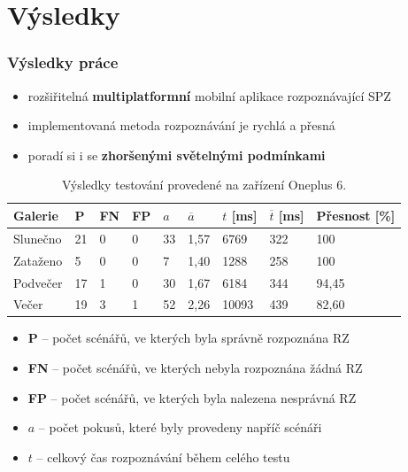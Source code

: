 \documentclass{beamer}
\begin{document}
\section{Výsledky}
\begin{frame}
\frametitle{Výsledky práce}
\begin{itemize}
    \item rozšiřitelná \textbf{multiplatformní} mobilní aplikace rozpoznávající SPZ
    \item implementovaná metoda rozpoznávání je rychlá a přesná
    \item poradí si i se \textbf{zhoršenými světelnými podmínkami}
\end{itemize}

\pause

\begin{table}[!ht]
    \centering
        \begin{tabular}{| l | l | l | l | l | l | l | l | l |}
            \hline
            Galerie & P & FN & FP & $a$ & $\overline{a}$ & $t$ [ms] & $\overline{t}$ [ms] & Přesnost [\%]  \\ \hline \hline
            Slunečno & 21 & 0 & 0 & 33 & 1,57 & 6769 & 322  & 100 \\ \hline
            Zataženo & 5 & 0 & 0 & 7 & 1,40 & 1288 & 258  & 100 \\ \hline
            Podvečer & 17 & 1 & 0 & 30 & 1,67 & 6184 & 344  & 94,45 \\ \hline
            Večer & 19 & 3 & 1 & 52 & 2,26 & 10093 & 439  & 82,60 \\ \hline
        \end{tabular}
        \caption{\label{tab:table-name}Výsledky testování provedené na zařízení Oneplus 6.}
\end{table}

\pause

\begingroup
    \fontsize{8pt}{12pt}\selectfont
    \begin{itemize}
        \item \textbf{P} -- počet scénářů, ve kterých byla správně rozpoznána RZ
        \item \textbf{FN} -- počet scénářů, ve kterých nebyla rozpoznána žádná RZ
        \item \textbf{FP} -- počet scénářů, ve kterých byla nalezena nesprávná RZ
        \item \textbf{$a$} -- počet pokusů, které byly provedeny napříč scénáři
        \item \textbf{$t$} -- celkový čas rozpoznávání během celého testu
    \end{itemize}
\endgroup

\end{frame}
\end{document}
